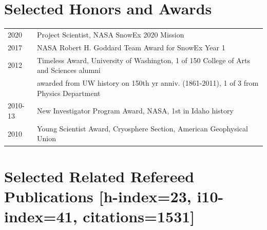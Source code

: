 \documentclass[11pt]{article}
\begin{document}
\section*{Selected Honors and Awards}
\begin{tabular}{ll}
2020 & Project Scientist, NASA SnowEx 2020 Mission \\
2017 & NASA Robert H. Goddard Team Award for SnowEx Year 1 \\
2012 & Timeless Award, University of Washington, 1 of 150 College of Arts and Sciences alumni  \\
& awarded from UW history on 150th yr anniv. (1861-2011), 1 of 3 from Physics Department \\
2010-13 & New Investigator Program Award, NASA, 1st in Idaho history \\
2010 & Young Scientist Award, Cryosphere Section, American Geophysical Union \\
\end{tabular}



\section*{Selected Related Refereed Publications \small{[h-index=23, i10-index=41, citations=1531]}}

\small{
 \vspace{0.15cm}  \\
 \vspace{0.15cm} \\
  \vspace{0.15cm} \\
 \vspace{0.15cm} \\ 
 \vspace{0.15cm} }
\end{document}
